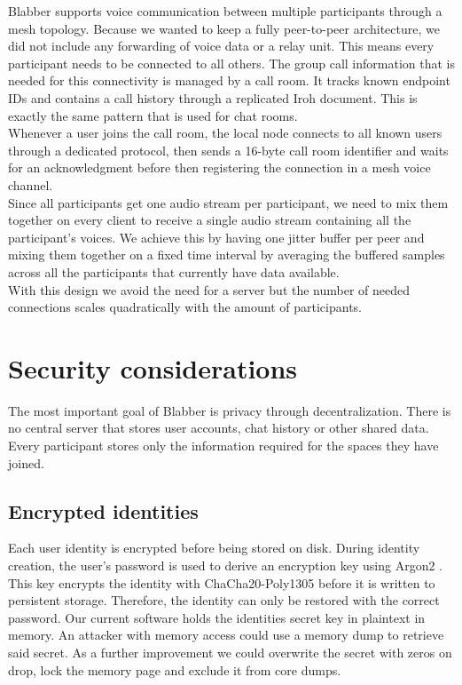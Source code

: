 \documentclass{article} %
\begin{document}
Blabber supports voice communication between multiple participants through a mesh topology. Because we wanted to keep a fully peer-to-peer architecture, we did not include any forwarding of voice data or a relay unit. This means every participant needs to be connected to all others. The group call information that is needed for this connectivity is managed by a call room. It tracks known endpoint IDs and contains a call history through a replicated Iroh document. This is exactly the same pattern that is used for chat rooms. \\
Whenever a user joins the call room, the local node connects to all known users through a dedicated protocol, then sends a 16-byte call room identifier and waits for an acknowledgment before then registering the connection in a mesh voice channel. \\
Since all participants get one audio stream per participant, we need to mix them together on every client to receive a single audio stream containing all the participant's voices. We achieve this by having one jitter buffer per peer and mixing them together on a fixed time interval by averaging the buffered samples across all the participants that currently have data available. \\
With this design we avoid the need for a server but the number of needed connections scales quadratically with the amount of participants.\\

\section{Security considerations}
The most important goal of Blabber is privacy through decentralization. There is no central server that stores user accounts, chat history or other shared data. Every participant stores
only the information required for the spaces they have joined.

\subsection{Encrypted identities}

Each user identity is encrypted before being stored on disk. During identity
creation, the user's password is used to derive an encryption key using
Argon2 \cite{argon2}. This key encrypts the identity with ChaCha20-Poly1305\cite{chacha} before it is
written to persistent storage. Therefore, the identity can only be restored with the correct password.
Our current software holds the identities secret key in plaintext in memory. An attacker with memory access could use a memory dump to retrieve said secret. As a further improvement we could overwrite the secret with zeros on drop, lock the memory page and exclude it from core dumps.
\end{document}
